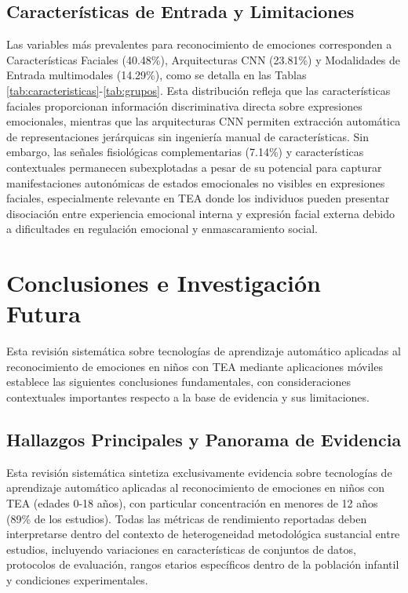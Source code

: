 \documentclass{ieeeaccess}
\begin{document}
	\subsection{Características de Entrada y Limitaciones}
	
	Las variables más prevalentes para reconocimiento de emociones corresponden a Características Faciales (40.48\%), Arquitecturas CNN (23.81\%) y Modalidades de Entrada multimodales (14.29\%), como se detalla en las Tablas \ref{tab:caracteristicas}-\ref{tab:grupos}. Esta distribución refleja que las características faciales proporcionan información discriminativa directa sobre expresiones emocionales, mientras que las arquitecturas CNN permiten extracción automática de representaciones jerárquicas sin ingeniería manual de características. Sin embargo, las señales fisiológicas complementarias (7.14\%) y características contextuales permanecen subexplotadas a pesar de su potencial para capturar manifestaciones autonómicas de estados emocionales no visibles en expresiones faciales, especialmente relevante en TEA donde los individuos pueden presentar disociación entre experiencia emocional interna y expresión facial externa debido a dificultades en regulación emocional y enmascaramiento social.
	
	\section{Conclusiones e Investigación Futura}
	\label{sec:conclusiones}
	
	Esta revisión sistemática sobre tecnologías de aprendizaje automático aplicadas al reconocimiento de emociones en niños con TEA mediante aplicaciones móviles establece las siguientes conclusiones fundamentales, con consideraciones contextuales importantes respecto a la base de evidencia y sus limitaciones.
	
	\subsection{Hallazgos Principales y Panorama de Evidencia}
	
	Esta revisión sistemática sintetiza exclusivamente evidencia sobre tecnologías de aprendizaje automático aplicadas al reconocimiento de emociones en niños con TEA (edades 0-18 años), con particular concentración en menores de 12 años (89\% de los estudios). Todas las métricas de rendimiento reportadas deben interpretarse dentro del contexto de heterogeneidad metodológica sustancial entre estudios, incluyendo variaciones en características de conjuntos de datos, protocolos de evaluación, rangos etarios específicos dentro de la población infantil y condiciones experimentales.
	
\end{document}
